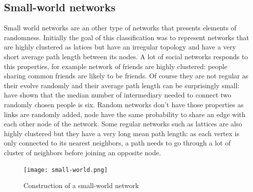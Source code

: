 \documentclass[a4paper, 12pt]{report}
\begin{document}
\subsection{Small-world networks}
Small world networks are an other type of networks that presents elements of randomness. Initially the goal of this classification was to represent networks that are highly clustered as latices but have an irregular topology and have a very short average path length between its nodes. A lot of social networks responds to this properties, for example network of friends are highly clustered: people sharing common friends are likely to be friends. Of course they are not regular as their evolve randomly and their average path length can be surprisingly small: \cite{milgram} have shown that the median number of intermediary needed to connect two randomly chosen people is six. Random networks don't have those properties as links are randomly added, node have the same probability to share an edge with each other node of the network. Some regular networks such as lattices are also highly clustered but they have a very long mean path length: as each vertex is only connected to its nearest neighbors, a path needs to go through a lot of cluster of neighbors before joining an opposite node. \citep{complex_networks} \\

\begin{figure}
\centering
\texttt{[image: small-world.png]}
\caption{Construction of a small-world network \citep{small-world}}
\label{small-world_pictures}
\end{figure}
\end{document}
